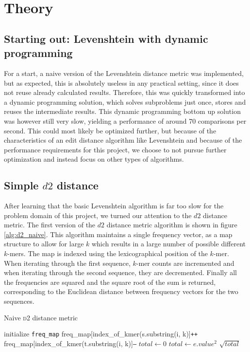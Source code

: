\section{Theory}
\subsection{Starting out: Levenshtein with dynamic programming}
For a start, a naive version of the Levenshtein distance metric was
implemented, but as expected, this is absolutely useless in any practical
setting, since it does not reuse already calculated results. Therefore, this
was quickly transformed into a dynamic programming solution, which solves
subproblems just once, stores and reuses the intermediate results. This dynamic
programming bottom up solution was however still very slow, yielding a
performance of around 70 comparisons per second. This could most likely be
optimized further, but because of the characteristics of an edit distance
algorithm like Levenshtein and because of the performance requirements for this
project, we choose to not pursue further optimization and instead focus on
other types of algorithms.

\subsection{Simple $d2$ distance}
After learning that the basic Levenshtein algorithm is far too slow for the
problem domain of this project, we turned our attention to the $d2$ distance
metric. The first version of the $d2$ distance metric algorithm is shown in
figure \ref{alg:d2_naive}. This algorithm maintains a single frequency vector,
as a map structure to allow for large $k$ which results in a large number of
possible different $k$-mers. The map is indexed using the lexicographical
position of the $k$-mer. When iterating through the first sequence, $k$-mer
counts are incremented and when iterating through the second sequence, they are
decremented. Finally all the frequencies are squared and the square root of the
sum is returned, corresponding to the Euclidean distance between frequency
vectors for the two sequences.

\begin{algorithm}
  \caption{Naive \textsc{d2} distance metric}
  \label{alg:d2_naive}
  \begin{algorithmic}[1]
    \Statex
      \State initialize \texttt{freq\_map}
        \State freq\_map[index\_of\_kmer(s.substring(i, k)]\texttt{++}
      \EndFor
        \State freq\_map[index\_of\_kmer(t.substring(i, k)]\texttt{--}
      \EndFor
      \State $total \gets 0$
        \State $total \gets e.value^2$  
      \EndFor
      \State \Return $\sqrt{total}$
    \EndFunction
  \end{algorithmic}
\end{algorithm}


